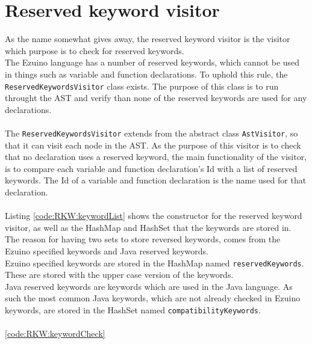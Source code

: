 \section{Reserved keyword visitor}
As the name somewhat gives away, the reserved keyword visitor is the visitor which purpose is to check for reserved keywords.\\
The Ezuino language has a number of reserved keywords, which cannot be used in things such as variable and function declarations. To uphold this rule, the \texttt{ReservedKeywordsVisitor} class exists. The purpose of this class is to run throught the AST and verify than none of the reserved keywords are used for any declarations.
\\\\
The \texttt{ReservedKeywordsVisitor} extends from the abstract class \texttt{AstVisitor}, so that it can visit each node in the AST. As the purpose of this visitor is to check that no declaration uses a reserved keyword, the main functionality of the visitor, is to compare each variable and function declaration's Id with a list of reserved keywords. The Id of a variable and function declaration is the name used for that declaration.
\\\\
Listing \ref{code:RKW:keywordList} shows the constructor for the reserved keyword visitor, as well as the HashMap and HashSet that the keywords are stored in. The reason for having two sets to store reversed keywords, comes from the Ezuino specified keywords and Java reserved keywords.\\
Ezuino specified keywords are stored in the HashMap named \texttt{reservedKeywords}. These are stored with the upper case version of the keywords.\\
Java reserved keywords are keywords which are used in the Java language. As such the most common Java keywords, which are not already checked in Ezuino keywords, are stored in the HashSet named \texttt{compatibilityKeywords}.
\\\\

\ref{code:RKW:keywordCheck}


